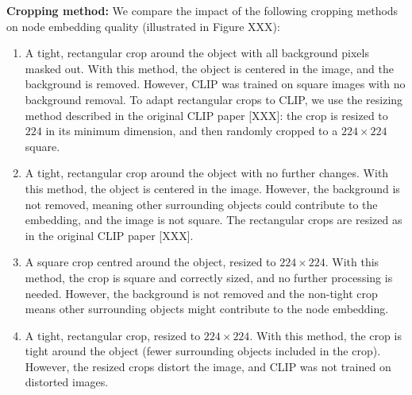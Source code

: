 \bigskip \noindent
\textbf{Cropping method:}
We compare the impact of the following cropping methods on node embedding quality (illustrated in Figure XXX):
\begin{enumerate}
    \item A tight, rectangular crop around the object with all background pixels masked out. With this method, the object is centered in the image, and the background is removed. However, CLIP was trained on square images with no background removal. To adapt rectangular crops to CLIP, we use the resizing method described in the original CLIP paper [XXX]: the crop is resized to $224$ in its minimum dimension, and then randomly cropped to a $224 \times 224$ square.
    
    \item A tight, rectangular crop around the object with no further changes. With this method, the object is centered in the image. However, the background is not removed, meaning other surrounding objects could contribute to the embedding, and the image is not square. The rectangular crops are resized as in the original CLIP paper [XXX].
    
    \item A square crop centred around the object, resized to $224 \times 224$. With this method, the crop is square and correctly sized, and no further processing is needed. However, the background is not removed and the non-tight crop means other surrounding objects might contribute to the node embedding.
    
    \item A tight, rectangular crop, resized to $224 \times 224$. With this method, the crop is tight around the object (fewer surrounding objects included in the crop). However, the resized crops distort the image, and CLIP was not trained on distorted images.
\end{enumerate}

